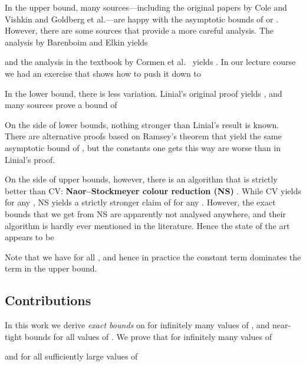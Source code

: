 \documentclass[a4paper,11pt]{article}
\theoremstyle{remark}
\begin{document}
In the upper bound, many sources---including the original papers by Cole and Vishkin and Goldberg et al.---are happy with the asymptotic bounds of  or . However, there are some sources that provide a more careful analysis. The analysis by Barenboim and Elkin \cite{barenboim13distributed} yields

and the analysis in the textbook by Cormen et al.~\cite{cormen90introduction} yields
.
In our lecture course \cite{suomela-dabook} we had an exercise that shows how to push it down to


In the lower bound, there is less variation. Linial's original proof \cite{linial92locality} yields , and many sources \cite{barenboim13distributed,suomela-dabook,laurinharju14linial-easy} prove a bound of


On the side of lower bounds, nothing stronger than Linial's result is known. There are alternative proofs based on Ramsey's theorem \cite{czygrinow08fast} that yield the same asymptotic bound of , but the constants one gets this way are worse than in Linial's proof.

On the side of upper bounds, however, there is an algorithm that is strictly better than CV: \textbf{Naor--Stockmeyer colour reduction (NS)} \cite{naor95what}. While CV yields  for any , NS yields a strictly stronger claim of  for any . However, the exact bounds that we get from NS are apparently not analysed anywhere, and their algorithm is hardly ever mentioned in the literature. Hence the state of the art appears to be

Note that we have  for all , and hence in practice the constant term  dominates the term  in the upper bound.


\subsection{Contributions}

In this work we derive \emph{exact bounds} on  for infinitely many values of , and near-tight bounds for all values of . We prove that for infinitely many values of 

and for all sufficiently large values of 
\end{document}

